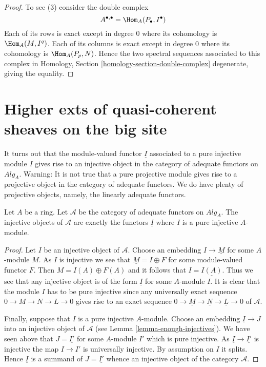 \begin{proof}
To see (3) consider the double complex
$$
A^{\bullet, \bullet} = \Hom_A(P_\bullet, I^\bullet)
$$
Each of its rows is exact except in degree $0$ where its cohomology
is $\Hom_A(M, I^q)$. Each of its columns is exact except in degree $0$
where its cohomology is $\Hom_A(P_p, N)$. Hence the two spectral
sequences associated to this complex in
Homology, Section \ref{homology-section-double-complex}
degenerate, giving the equality.
\end{proof}





\section{Higher exts of quasi-coherent sheaves on the big site}
\label{section-big}

\noindent
It turns out that the module-valued functor $\underline{I}$ associated to
a pure injective module $I$ gives rise to an injective object in the
category of adequate functors on $\textit{Alg}_A$.
Warning: It is not true that a pure projective module gives rise to
a projective object in the category of adequate functors. We do have
plenty of projective objects, namely, the linearly adequate functors.

\begin{lemma}
\label{lemma-pure-injective-injective-adequate}
Let $A$ be a ring.
Let $\mathcal{A}$ be the category of adequate functors on $\textit{Alg}_A$.
The injective objects of $\mathcal{A}$ are exactly the functors
$\underline{I}$ where $I$ is a pure injective $A$-module.
\end{lemma}

\begin{proof}
Let $I$ be an injective object of $\mathcal{A}$.
Choose an embedding $I \to \underline{M}$ for some $A$-module $M$.
As $I$ is injective we see that $\underline{M} = I \oplus F$ for some
module-valued functor $F$. Then $M = I(A) \oplus F(A)$ and it follows
that $I = \underline{I(A)}$. Thus we see that any injective object
is of the form $\underline{I}$ for some $A$-module $I$.
It is clear that the module $I$ has to be pure injective
since any universally exact sequence $0 \to M \to N \to L \to 0$
gives rise to an exact sequence
$0 \to \underline{M} \to \underline{N} \to \underline{L} \to 0$
of $\mathcal{A}$.

\medskip\noindent
Finally, suppose that $I$ is a pure injective
$A$-module. Choose an embedding $\underline{I} \to J$
into an injective object of $\mathcal{A}$ (see
Lemma \ref{lemma-enough-injectives}).
We have seen above that $J = \underline{I'}$
for some $A$-module $I'$ which is pure injective. As
$\underline{I} \to \underline{I'}$ is injective
the map $I \to I'$ is universally injective. By assumption on $I$
it splits. Hence $\underline{I}$ is a summand of $J = \underline{I'}$
whence an injective object of the category $\mathcal{A}$.
\end{proof}

